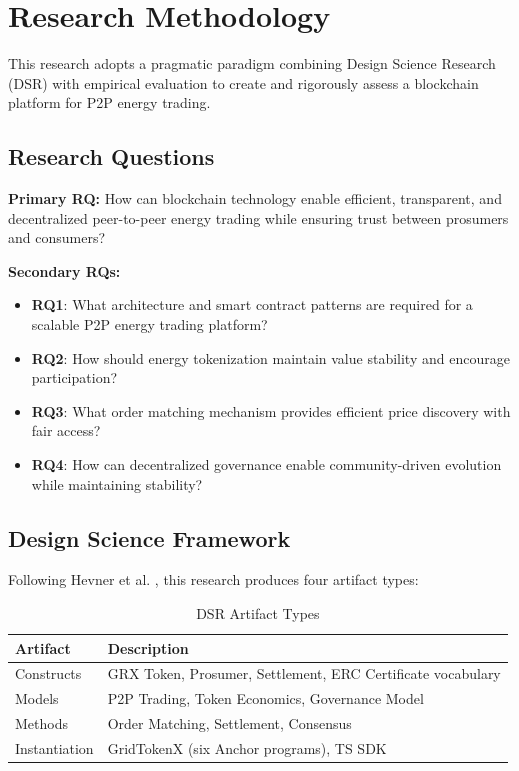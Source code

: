 \documentclass[conference]{IEEEtran}
\begin{document}
\section{Research Methodology}
\label{sec:methodology}

This research adopts a pragmatic paradigm combining Design Science Research (DSR) \cite{hevner2004} with empirical evaluation to create and rigorously assess a blockchain platform for P2P energy trading.

\subsection{Research Questions}

\textbf{Primary RQ:} How can blockchain technology enable efficient, transparent, and decentralized peer-to-peer energy trading while ensuring trust between prosumers and consumers?

\textbf{Secondary RQs:}
\begin{itemize}
    \item \textbf{RQ1}: What architecture and smart contract patterns are required for a scalable P2P energy trading platform?
    \item \textbf{RQ2}: How should energy tokenization maintain value stability and encourage participation?
    \item \textbf{RQ3}: What order matching mechanism provides efficient price discovery with fair access?
    \item \textbf{RQ4}: How can decentralized governance enable community-driven evolution while maintaining stability?
\end{itemize}

\subsection{Design Science Framework}

Following Hevner et al. \cite{hevner2004}, this research produces four artifact types:

\begin{table}[htbp]
\caption{DSR Artifact Types}
\begin{center}
\small
\begin{tabular}{@{}lp{5.8cm}@{}}
\toprule
\textbf{Artifact} & \textbf{Description} \\
\midrule
Constructs & GRX Token, Prosumer, Settlement, ERC Certificate vocabulary \\
Models & P2P Trading, Token Economics, Governance Model \\
Methods & Order Matching, Settlement, Consensus \\
Instantiation & GridTokenX (six Anchor programs), TS SDK \\
\bottomrule
\end{tabular}
\label{tab:artifacts}
\end{center}
\end{table}
\end{document}
